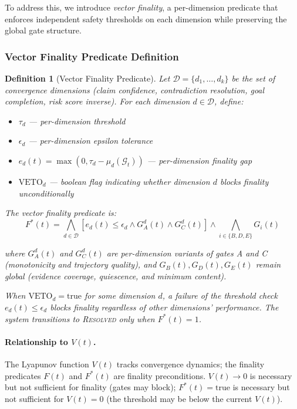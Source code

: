 \documentclass[11pt]{article}
\newtheorem{definition}{Definition}
\begin{document}
To address this, we introduce \emph{vector finality}, a per-dimension predicate that enforces
independent safety thresholds on each dimension while preserving the global gate structure.

\subsubsection{Vector Finality Predicate Definition}

\begin{definition}[Vector Finality Predicate]
\label{def:vector-finality}
Let $\mathcal{D} = \{d_1, \ldots, d_k\}$ be the set of convergence dimensions
(claim confidence, contradiction resolution, goal completion, risk score inverse).
For each dimension $d \in \mathcal{D}$, define:
\begin{itemize}
  \item $\tau_d$ — per-dimension threshold
  \item $\epsilon_d$ — per-dimension epsilon tolerance
  \item $e_d(t) = \max(0, \tau_d - \mu_d(\mathcal{G}_t))$ — per-dimension finality gap
  \item $\text{VETO}_d$ — boolean flag indicating whether dimension $d$ blocks finality unconditionally
\end{itemize}

The vector finality predicate is:
\[
F^*(t) = \bigwedge_{d \in \mathcal{D}} \left[ e_d(t) \leq \epsilon_d \wedge G_A^d(t) \wedge G_C^d(t) \right] \wedge \bigwedge_{i \in \{B,D,E\}} G_i(t)
\]

where $G_A^d(t)$ and $G_C^d(t)$ are per-dimension variants of gates A and C (monotonicity and
trajectory quality), and $G_B(t), G_D(t), G_E(t)$ remain global (evidence coverage, quiescence,
and minimum content).

When $\text{VETO}_d = \text{true}$ for some dimension $d$, a failure of the threshold check
$e_d(t) \leq \epsilon_d$ blocks finality regardless of other dimensions' performance. The system
transitions to \textnormal{\textsc{Resolved}} only when $F^*(t) = 1$.
\end{definition}

\paragraph{Relationship to $V(t)$.}
The Lyapunov function $V(t)$ tracks convergence dynamics; the finality predicates $F(t)$ and $F^*(t)$ are finality preconditions. $V(t) \to 0$ is necessary but not sufficient for finality (gates may block); $F^*(t) = \mathrm{true}$ is necessary but not sufficient for $V(t) = 0$ (the threshold may be below the current $V(t)$).
\end{document}
